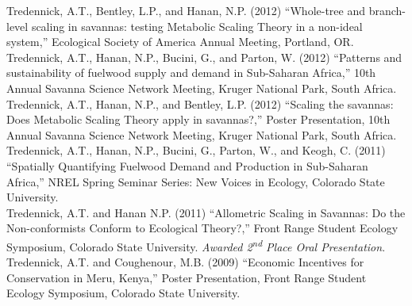 \documentclass[margin,line]{resume}
\begin{document}
\begin{resume}
    Tredennick, A.T., Bentley, L.P., and Hanan, N.P. (2012) ``Whole-tree and branch-level scaling in savannas: testing Metabolic Scaling Theory in a non-ideal system,'' Ecological Society of America Annual Meeting, Portland, OR. \vspace{-6mm}\\%
    
    Tredennick, A.T., Hanan, N.P., Bucini, G., and Parton, W. (2012) ``Patterns and sustainability of fuelwood supply and demand in Sub-Saharan Africa,'' 10th Annual Savanna Science Network Meeting, Kruger National Park, South Africa.\vspace{-6mm}\\%
    
    Tredennick, A.T., Hanan, N.P., and Bentley, L.P. (2012) ``Scaling the savannas: Does Metabolic Scaling Theory apply in savannas?,'' Poster Presentation, 10th Annual Savanna Science Network Meeting, Kruger National Park, South Africa. \vspace{-6mm}\\%

    Tredennick, A.T., Hanan, N.P., Bucini, G., Parton, W., and Keogh, C. (2011) ``Spatially Quantifying Fuelwood Demand and Production in Sub-Saharan Africa,'' NREL Spring Seminar Series: New Voices in Ecology, Colorado State University.\vspace{-6mm}\\%
    
    Tredennick, A.T. and Hanan N.P. (2011) ``Allometric Scaling in Savannas: Do the Non-conformists Conform to Ecological Theory?,'' Front Range Student Ecology Symposium, Colorado State University. \textsl{Awarded 2\textsuperscript{nd} Place Oral Presentation}.\vspace{-6mm}\\%
  
  Tredennick, A.T. and Coughenour, M.B. (2009) ``Economic Incentives for Conservation in Meru, Kenya,'' Poster Presentation, Front Range Student Ecology Symposium, Colorado State University.

\end{resume}
\end{document}
